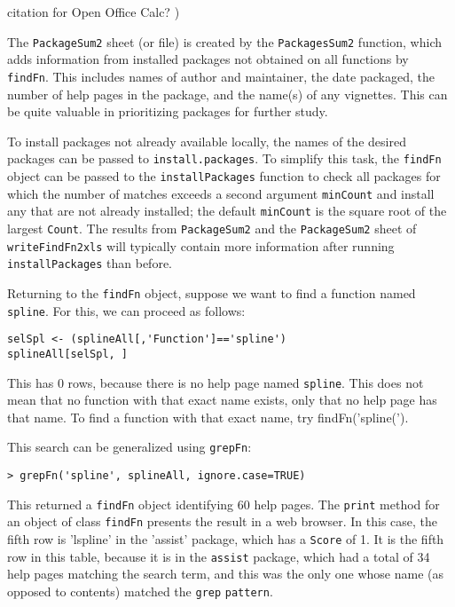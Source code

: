 citation for Open Office Calc?
)

The {\tt PackageSum2} sheet (or file) is created by the
{\tt PackagesSum2} function, which adds information from
installed packages not obtained on all functions by
{\tt findFn}.  This includes names of author and maintainer,
the date packaged, the number of help pages in the package,
and the name(s) of any vignettes.  This can be quite
valuable in prioritizing packages for further study.

To install packages not already available locally,
the names of the desired packages can be passed to
{\tt install.packages}.  To simplify this task, the 
{\tt findFn} object can be passed to the {\tt installPackages} 
function to check all packages for which the number of 
matches exceeds a second argument {\tt minCount} and 
install any that are not already installed;  the default 
{\tt minCount} is the square root of the largest {\tt Count}.  
The results from {\tt PackageSum2} and the {\tt PackageSum2}
sheet of {\tt writeFindFn2xls} will typically contain
more information after running {\tt installPackages}
than before.





Returning to the {\tt findFn} object, suppose we want
to find a function named {\tt spline}.  For this, we can
proceed as follows:
\begin{verbatim}
selSpl <- (splineAll[,'Function']=='spline')
splineAll[selSpl, ]
\end{verbatim}
This has 0 rows, because there is no help page named
{\tt spline}.  This does not mean that no function
with that exact name exists, only that no help page
has that name.  To find a function with that exact
name, try {findFn('spline(')}.

This search can be generalized using {\tt grepFn}:
\begin{verbatim}
> grepFn('spline', splineAll, ignore.case=TRUE)
\end{verbatim}
This returned a {\tt findFn} object identifying 60 help pages.
The {\tt print} method for an object of class {\tt findFn}
presents the result in a web browser.  In this case,
the fifth row is 'lspline' in the
'assist' package, which has a {\tt Score} of 1.  It
is the fifth row in this table, because it is in the
{\tt assist} package, which had a total of 34 help
pages matching the search term, and this was the only
one whose name (as opposed to contents) matched the
{\tt grep} {\tt pattern}.








